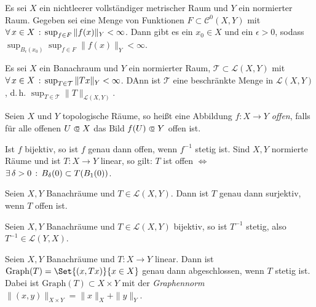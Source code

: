 \documentclass{cheat-sheet}
\newcommand{\Leb}{\mathcal{L}} %
\begin{document}
\begin{satz}
  Es sei $X$ ein nichtleerer vollständiger metrischer Raum und $Y$ ein normierter Raum. Gegeben sei eine Menge von Funktionen $F \subset \mathcal{C}^0(X, Y)$ mit $\forall \, {x \in X} \,:\, \sup_{f \in F} \|f(x)\|_Y < \infty$. Dann gibt es ein $x_0 \in X$ und ein $\epsilon > 0$, sodass $\sup_{B_\epsilon(x_0)} \sup_{f \in F} \|f(x)\|_Y < \infty$.
\end{satz}

\begin{satz}
  Es sei $X$ ein Banachraum und $Y$ ein normierter Raum, $\mathcal{T} \subset \Leb(X, Y)$ mit $\forall \, {x \in X} \,:\, \sup_{T \in \mathcal{T}} \|Tx\|_Y < \infty$. DAnn ist $\mathcal{T}$ eine beschränkte Menge in $\Leb(X, Y)$, d.\,h. $\sup_{T \in \mathcal{T}} \|T\|_{\mathcal{L}(X, Y)}$.
\end{satz}

\begin{defn}
  Seien $X$ und $Y$ topologische Räume, so heißt eine Abbildung $f : X \to Y$ \emph{offen}, falls für alle offenen $U \opn X$ das Bild $f(U) \opn Y$ offen ist.
\end{defn}

\begin{bem}
  Ist $f$ bijektiv, so ist $f$ genau dann offen, wenn $f^{-1}$ stetig ist. Sind $X, Y$ normierte Räume und ist $T : X \to Y$ linear, so gilt: $T$ ist offen $\iff$ $\exists \, {\delta > 0} \,:\, B_{\delta}(0) \subset T(B_1(0))$.
\end{bem}

\begin{satz}
  Seien $X, Y$ Banachräume und $T \in \mathcal{L}(X, Y)$. Dann ist $T$ genau dann surjektiv, wenn $T$ offen ist.
\end{satz}

\begin{satz}
  Seien $X, Y$ Banachräume und $T \in \mathcal{L}(X, Y)$ bijektiv, so ist $T^{-1}$ stetig, also $T^{-1} \in \mathcal{L}(Y, X)$.
\end{satz}

\begin{satz}
  Seien $X, Y$ Banachräume und $T : X \to Y$ linear. Dann ist $\mathrm{Graph}(T) = \Set{ (x, Tx) }{ x \in X }$ genau dann abgeschlossen, wenn $T$ stetig ist. Dabei ist $\mathrm{Graph}(T) \subset X \times Y$ mit der \emph{Graphennorm} $\|(x,y)\|_{X \times Y} = \|x\|_X + \|y\|_Y$.
\end{satz}
\end{document}

